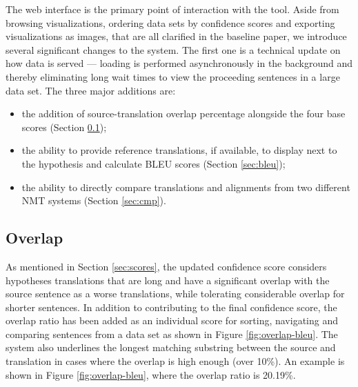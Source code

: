 \documentclass[runningheads,a4paper]{lncs/llncs}
\begin{document}
The web interface is the primary point of interaction with the tool. Aside from browsing visualizations, ordering data sets by confidence scores and exporting visualizations as images, that are all clarified in the baseline paper, we introduce several significant changes to the system. The first one is a technical update on how data is served --- loading is performed asynchronously in the background and thereby eliminating long wait times to view the proceeding sentences in a large data set. 
The three major additions are:
  \begin{itemize}
    \item the addition of source-translation overlap percentage alongside the four base scores (Section \ref{sec:over});
    \item the ability to provide reference translations, if available, to display next to the hypothesis and calculate BLEU scores (Section \ref{sec:bleu});
    \item the ability to directly compare translations and alignments from two different NMT systems (Section \ref{sec:cmp}).
  \end{itemize}





\subsection{Overlap}
\label{sec:over}

As mentioned in Section \ref{sec:scores}, the updated confidence score considers hypotheses translations that are long and have a significant overlap with the source sentence as a worse translations, while tolerating considerable overlap for shorter sentences. 
In addition to contributing to the final confidence score, the overlap ratio has been added as an individual score for sorting, navigating and comparing sentences from a data set as shown in Figure \ref{fig:overlap-bleu}.
The system also underlines the longest matching substring between the source and translation in cases where the overlap is high enough (over 10\%). An example is shown in Figure \ref{fig:overlap-bleu}, where the overlap ratio is 20.19\%. 
\end{document}
